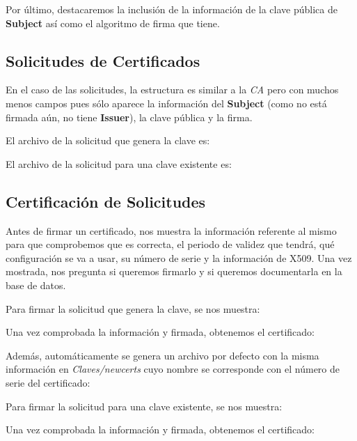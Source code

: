 \documentclass[a4paper, 11pt]{article}
\begin{document}
		Por último, destacaremos la inclusión de la información de la clave pública de \textbf{Subject} así como el
		algoritmo de firma que tiene.
		
	\subsection{Solicitudes de Certificados}
		En el caso de las solicitudes, la estructura es similar a la \textit{CA} pero con muchos menos campos pues sólo
		aparece la información del \textbf{Subject} (como no está firmada aún, no tiene \textbf{Issuer}), la clave pública
		y la firma.
		
		El archivo de la solicitud que genera la clave es:
		
		
		El archivo de la solicitud para una clave existente es:
		
		
	\subsection{Certificación de Solicitudes}
		Antes de firmar un certificado, nos muestra la información referente al mismo para que comprobemos que es correcta,
		el periodo de validez que tendrá, qué configuración se va a usar, su número de serie y la información de X509. Una
		vez mostrada, nos pregunta si queremos firmarlo y si queremos documentarla en la base de datos.
		
		Para firmar la solicitud que genera la clave, se nos muestra:
		
		
		Una vez comprobada la información y firmada, obtenemos el certificado:
		
		
		Además, automáticamente se genera un archivo por defecto con la misma información en \textit{Claves/newcerts} cuyo
		nombre se corresponde con el número de serie del certificado:
		
		
		Para firmar la solicitud para una clave existente, se nos muestra:
		
		
		Una vez comprobada la información y firmada, obtenemos el certificado:
		
		
\end{document}

